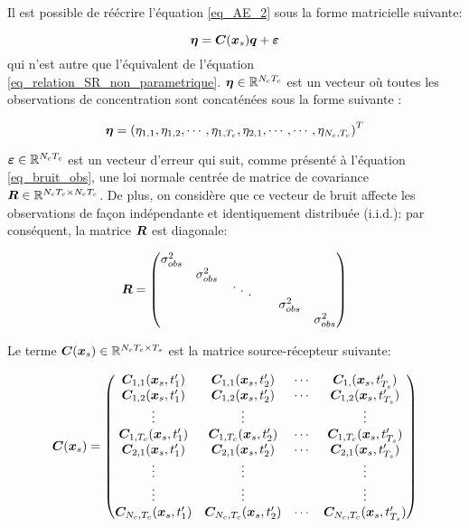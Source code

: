 Il est possible de réécrire l'équation \eqref{eq_AE_2} sous la forme matricielle suivante:

\begin{equation}
{\bm{\eta}} = {\bm{C}}({\bm{x}_s}){\bm{q}} + {\bm{\varepsilon}}
\label{eq_AE_3}
\end{equation}
qui n'est autre que l'équivalent de l'équation \eqref{eq_relation_SR_non_parametrique}. ${\bm{\eta}} \in \mathbb{R}^{N_cT_c}$ est un vecteur où toutes les observations de concentration sont concaténées sous la forme suivante : 

\begin{equation}
{\bm{\eta}} = \left({\eta}_{1,1}, {\eta}_{1,2}, \cdots, {\eta}_{1,T_c}, {\eta}_{2,1}, \cdots, \cdots, {\eta}_{N_c,T_c}\right)^T
\label{eq_AE_3_plus}
\end{equation}

${\bm{\varepsilon}} \in \mathbb{R}^{N_cT_c}$ est un vecteur d'erreur qui suit, comme présenté à l'équation \eqref{eq_bruit_obs}, une loi normale centrée de matrice de covariance ${\bm{R}} \in \mathbb{R}^{N_cT_c \times N_cT_c}$. De plus, on considère que ce vecteur de bruit affecte les observations de façon indépendante et identiquement distribuée (i.i.d.): par conséquent, la matrice ${\bm{R}}$ est diagonale:


\begin{equation}
\MatR = 
\begin{pmatrix}
\diagentry{\varObs}\\
&\diagentry{\varObs}\\
&&\diagentry{\xddots}\\
&&&&\diagentry{\varObs}\\
&&&&&\diagentry{\varObs}\\
\end{pmatrix}
\label{eq_AE_covariance_obs}
\end{equation}

Le terme ${\bm{C}}({\bm{x}_s}) \in \mathbb{R}^{N_cT_c \times T_s}$ est la matrice source-récepteur suivante:

\begin{equation}
{\bm{C}}({\bm{x}_s}) = 
\begin{pmatrix}
{\bm{C}}_{1,1}({\bm{x}_s}, t'_1) & {\bm{C}}_{1,1}({\bm{x}_s}, t'_2)  & \cdots & {\bm{C}}_{1,}({\bm{x}_s}, t'_{T_s}) \\ 
{\bm{C}}_{1,2}({\bm{x}_s}, t'_1) & {\bm{C}}_{1,2}({\bm{x}_s}, t'_2)  & \cdots & {\bm{C}}_{1,2}({\bm{x}_s}, t'_{T_s}) \\
\vdots & \vdots &  & \vdots \\
{\bm{C}}_{1,T_c}({\bm{x}_s}, t'_1) & {\bm{C}}_{1,T_c}({\bm{x}_s}, t'_2)  & \cdots & {\bm{C}}_{1,T_c}({\bm{x}_s}, t'_{T_s}) \\
{\bm{C}}_{2,1}({\bm{x}_s}, t'_1) & {\bm{C}}_{2,1}({\bm{x}_s}, t'_2)  & \cdots & {\bm{C}}_{2,1}({\bm{x}_s}, t'_{T_s}) \\
\vdots & \vdots &  & \vdots \\
\vdots & \vdots &  & \vdots \\
{\bm{C}}_{N_c,T_c}({\bm{x}_s},  t'_1) & {\bm{C}}_{N_c,T_c}({\bm{x}_s},  t'_2)  & \cdots & {\bm{C}}_{N_c,T_c}({\bm{x}_s},  t'_{T_s}) \\
\end{pmatrix}
\label{eq_AE_4}
\end{equation}

